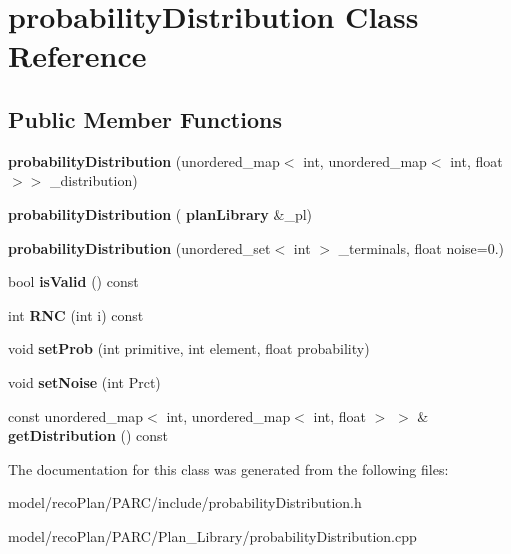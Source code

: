 \section{probability\+Distribution Class Reference}
\label{classprobability_distribution}
\subsection*{Public Member Functions}
\begin{DoxyCompactItemize}
\item 
\mbox{\label{classprobability_distribution_a2a995499889b4264a99eb5d4c929c560}} 
{\bfseries probability\+Distribution} (unordered\+\_\+map$<$ int, unordered\+\_\+map$<$ int, float $>$$>$ \+\_\+distribution)
\item 
\mbox{\label{classprobability_distribution_a701b32e41142bc9f298e516e4e422be4}} 
{\bfseries probability\+Distribution} (\textbf{ plan\+Library} \&\+\_\+pl)
\item 
\mbox{\label{classprobability_distribution_a7b482f50162c74e33558e911fa1d0cda}} 
{\bfseries probability\+Distribution} (unordered\+\_\+set$<$ int $>$ \+\_\+terminals, float noise=0.)
\item 
\mbox{\label{classprobability_distribution_a430d2970d87e8e928ae00cb346d5400a}} 
bool {\bfseries is\+Valid} () const
\item 
\mbox{\label{classprobability_distribution_a08eb703110c0c00ec2425e23311446c9}} 
int {\bfseries R\+NC} (int i) const
\item 
\mbox{\label{classprobability_distribution_a760246a89973b3cdcb3e56716251530c}} 
void {\bfseries set\+Prob} (int primitive, int element, float probability)
\item 
\mbox{\label{classprobability_distribution_a09394253f3ca51cc426b4c666619003f}} 
void {\bfseries set\+Noise} (int Prct)
\item 
\mbox{\label{classprobability_distribution_a5cf179f2819de49f2d6524f4ff8efd35}} 
const unordered\+\_\+map$<$ int, unordered\+\_\+map$<$ int, float $>$ $>$ \& {\bfseries get\+Distribution} () const
\end{DoxyCompactItemize}


The documentation for this class was generated from the following files\+:\begin{DoxyCompactItemize}
\item 
model/reco\+Plan/\+P\+A\+R\+C/include/probability\+Distribution.\+h\item 
model/reco\+Plan/\+P\+A\+R\+C/\+Plan\+\_\+\+Library/probability\+Distribution.\+cpp\end{DoxyCompactItemize}
